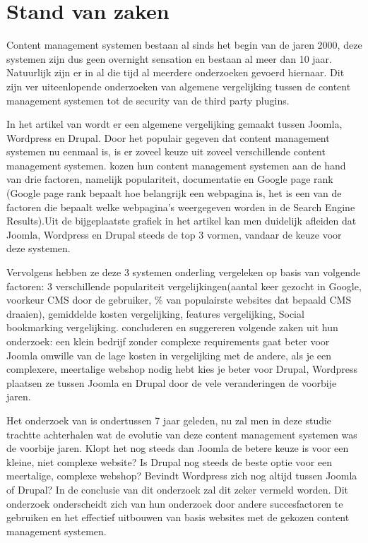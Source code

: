 \chapter{Stand van zaken}
\label{ch:stand-van-zaken}


Content management systemen bestaan al sinds het begin van de jaren 2000, deze systemen zijn dus geen overnight sensation en bestaan al meer dan 10 jaar. Natuurlijk zijn er in al die tijd al meerdere onderzoeken gevoerd hiernaar. Dit zijn ver uiteenlopende onderzoeken van algemene vergelijking tussen de content management systemen tot de security van de third party plugins. 

In het artikel van \textcite{Patel2011} wordt er een algemene vergelijking gemaakt tussen Joomla, Wordpress en Drupal. Door het populair gegeven dat content management systemen nu eenmaal is, is er zoveel keuze uit zoveel verschillende content management systemen.
\textcite{Patel2011} kozen hun content management systemen aan de hand van drie factoren, namelijk populariteit, documentatie en Google page rank (Google page rank bepaalt hoe belangrijk een webpagina is, het is een van de factoren die bepaalt welke webpagina's weergegeven worden in de Search Engine Results).Uit de bijgeplaatste grafiek in het artikel kan men duidelijk afleiden dat Joomla, Wordpress en Drupal steeds de top 3 vormen, vandaar de keuze voor deze systemen.

Vervolgens hebben ze deze 3 systemen onderling vergeleken op basis van volgende factoren: 3 verschillende populariteit vergelijkingen(aantal keer gezocht in Google, voorkeur CMS door de gebruiker, \% van populairste websites dat bepaald CMS draaien), gemiddelde kosten vergelijking, features vergelijking, Social bookmarking vergelijking. \textcite{Patel2011} concluderen en suggereren volgende zaken uit hun onderzoek: een klein bedrijf zonder complexe requirements gaat beter voor Joomla omwille van de lage kosten in vergelijking met de andere, als je een complexere, meertalige webshop nodig hebt kies je beter voor Drupal, Wordpress plaatsen ze tussen Joomla en Drupal door de vele veranderingen de voorbije jaren.

Het onderzoek van \textcite{Patel2011} is ondertussen 7 jaar geleden, nu zal men in deze studie trachtte achterhalen wat de evolutie van deze content management systemen was de voorbije jaren. Klopt het nog steeds dan Joomla de betere keuze is voor een kleine, niet complexe website? Is Drupal nog steeds de beste optie voor een meertalige, complexe webshop? Bevindt Wordpress zich nog altijd tussen Joomla of Drupal? In de conclusie van dit onderzoek zal dit zeker vermeld worden. Dit onderzoek onderscheidt zich van \textcite{Patel2011} hun onderzoek door andere succesfactoren te gebruiken en het effectief uitbouwen van basis websites met de gekozen content management systemen.


